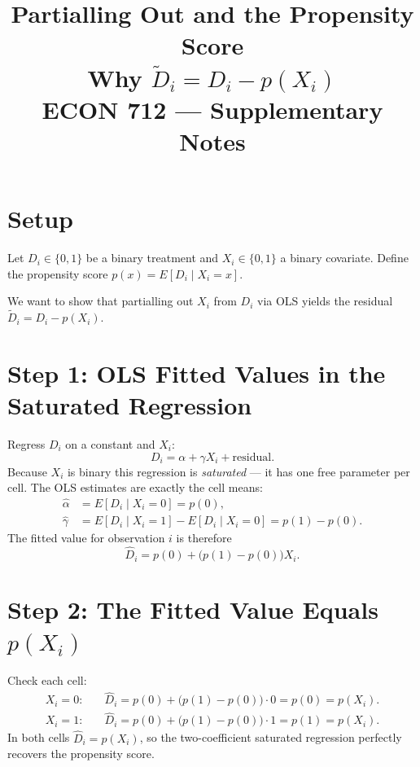 \documentclass[11pt]{article}
\title{%
  \textbf{Partialling Out and the Propensity Score}\\[6pt]
  \large Why $\tilde{D}_i = D_i - p(X_i)$\\[4pt]
  \normalsize ECON 712 --- Supplementary Notes
}
\author{}
\date{}
\theoremstyle{remark}
\begin{document}
\maketitle

\section{Setup}

Let $D_i \in \{0,1\}$ be a binary treatment and $X_i \in \{0,1\}$ a binary
covariate. Define the propensity score $p(x) = E[D_i \mid X_i = x]$.

We want to show that partialling out $X_i$ from $D_i$ via OLS yields the
residual $\tilde{D}_i = D_i - p(X_i)$.

\section{Step 1: OLS Fitted Values in the Saturated Regression}

Regress $D_i$ on a constant and $X_i$:
\[
  D_i = \alpha + \gamma X_i + \text{residual}.
\]
Because $X_i$ is binary this regression is \emph{saturated} --- it has one
free parameter per cell.  The OLS estimates are exactly the cell means:
\begin{align*}
  \hat\alpha &= E[D_i \mid X_i = 0] = p(0), \\
  \hat\gamma &= E[D_i \mid X_i = 1] - E[D_i \mid X_i = 0] = p(1) - p(0).
\end{align*}
The fitted value for observation $i$ is therefore
\[
  \hat{D}_i = p(0) + \bigl(p(1)-p(0)\bigr)X_i.
\]

\section{Step 2: The Fitted Value Equals $p(X_i)$}

Check each cell:
\begin{align*}
  X_i = 0: \quad & \hat{D}_i = p(0) + \bigl(p(1)-p(0)\bigr)\cdot 0 = p(0) = p(X_i). \\
  X_i = 1: \quad & \hat{D}_i = p(0) + \bigl(p(1)-p(0)\bigr)\cdot 1 = p(1) = p(X_i).
\end{align*}
In both cells $\hat{D}_i = p(X_i)$, so the two-coefficient saturated regression
perfectly recovers the propensity score.
\end{document}
